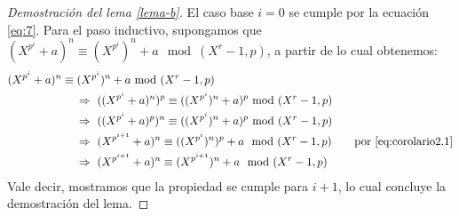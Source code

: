 \documentclass[10pt]{article}
\newcommand{\0}{\mathbf{0}}
\newcommand{\1}{\mathbf{1}}
\newcommand{\modulop}{\mod (X^r-1,p)}
\newcommand{\modulops}{\!\!\mod (X^r-1,p)}
\newcommand{\+}{\oplus}
\newcommand{\comentarioin}[1]{}
\theoremstyle{remark}
\theoremstyle{remark}
\begin{document}
	\begin{proof}[Demostración del lema \ref{lema-b}]
		El caso base $i = 0$ se cumple por la ecuación \eqref{eq:7}. Para el paso inductivo, supongamos que $(X^{p^i}+a)^n\equiv (X^{p^i})^n + a \modulop$, a partir de lo cual obtenemos: 
		\begin{align*}
			&(X^{p^i}+a)^n\equiv (X^{p^i})^n + a \modulops\\
			&\hspace{60pt}\Rightarrow \ ((X^{p^i}+a)^n)^p\equiv ((X^{p^i})^n + a)^p \modulops\\
			&\hspace{60pt}\Rightarrow \ ((X^{p^i}+a)^p)^n\equiv ((X^{p^i})^n + a)^p \modulops\\
			&\hspace{60pt}\Rightarrow \ (X^{p^{i+1}}+a)^n\equiv ((X^{p^i})^n)^p + a \modulop \quad\quad \text{por }\eqref{eq:corolario2.1}\\
			&\hspace{60pt}\Rightarrow \ (X^{p^{i+1}}+a)^n\equiv (X^{p^{i+1}})^n + a \modulop
		\end{align*}
		Vale decir, mostramos que la propiedad se cumple para $i+1$, lo cual concluye la demostración del lema. 
	\end{proof}

        
\end{document}
